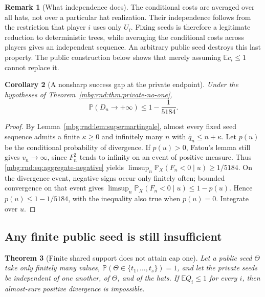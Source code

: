\documentclass[11pt,letterpaper]{article}
\newtheorem{theorem}{Theorem}[section]
\newtheorem{corollary}[theorem]{Corollary}
\theoremstyle{definition}
\newtheorem{remark}[theorem]{Remark}
\newcommand{\E}{\mathbb E}
\newcommand{\Prb}{\mathbb P}
\begin{document}
\begin{remark}[What independence does]
The conditional costs are averaged over all hats, not over a particular
hat realization. Their independence follows from the restriction that
player $i$ uses only $U_i$. Fixing seeds is therefore a legitimate
reduction to deterministic trees, while averaging the conditional costs
across players gives an independent sequence. An arbitrary public seed
destroys this last property. The public construction below shows that
merely assuming $\E c_i\le1$ cannot replace it.
\end{remark}

\begin{corollary}[A nonsharp success gap at the private endpoint]
\label{mbg:rnd:cor:private-gap}
Under the hypotheses of Theorem~\ref{mbg:rnd:thm:private-no-one},
\begin{equation}
 \Prb(D_n\to+\infty)\le1-\frac1{5184}.
 \label{mbg:rnd:eq:private-gap}
\end{equation}
\end{corollary}
\begin{proof}
By Lemma~\ref{mbg:rnd:lem:supermartingale}, almost every fixed seed sequence admits
a finite $\kappa\ge0$ and infinitely many $n$ with $\bar q_n\le n+\kappa$.
Let $p(u)$ be the conditional probability of divergence. If $p(u)>0$,
Fatou's lemma still gives $v_n\to\infty$, since $F_n^2$ tends to
infinity on an event of positive measure. Thus
\eqref{mbg:rnd:eq:aggregate-negative} yields
$\limsup_n\Prb_X(F_n<0\mid u)\ge1/5184$.
On the divergence event, negative signs occur only finitely often;
bounded convergence on that event gives
$\limsup_n\Prb_X(F_n<0\mid u)\le1-p(u)$.
Hence $p(u)\le1-1/5184$, with the inequality also true when $p(u)=0$.
Integrate over $u$.
\end{proof}

\subsection{Any finite public seed is still insufficient}

\begin{theorem}[Finite shared support does not attain cap one]
\label{mbg:rnd:thm:finite-public}
Let a public seed $\Theta$ take only finitely many values,
$\Prb(\Theta\in\{t_1,\ldots,t_s\})=1$, and let the private seeds be independent of one
another, of $\Theta$, and of the hats. If $\E Q_i\le1$ for every $i$, then
almost-sure positive divergence is impossible.
\end{theorem}
\end{document}
